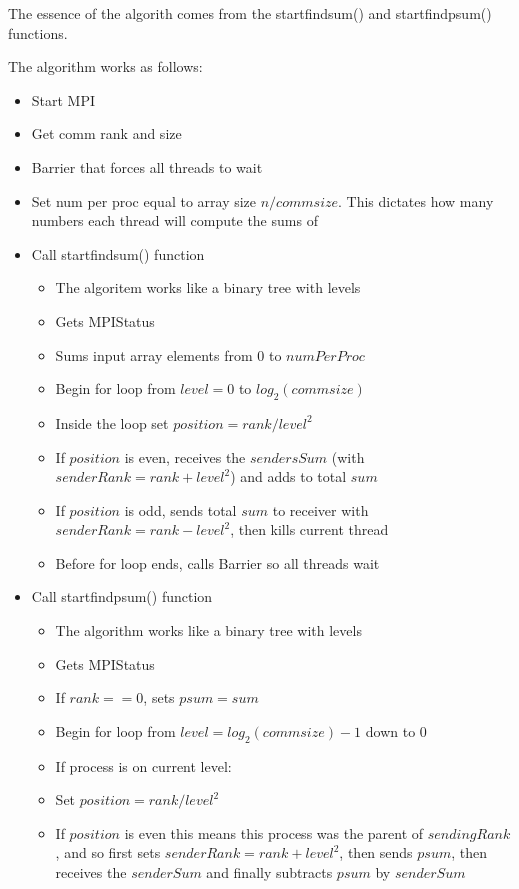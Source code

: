 	The essence of the algorith comes from the start\textunderscore find\textunderscore sum() and start\textunderscore find\textunderscore psum() functions.
	
	The algorithm works as follows:
	\begin{itemize}
		\item Start MPI
		\item Get comm rank and size
		\item Barrier that forces all threads to wait
		\item Set num per proc equal to array size $n / comm size$. This dictates how many numbers each thread will compute the sums of
		\item Call start\textunderscore find\textunderscore sum() function
		\begin{itemize}
			\item The algoritem works like a binary tree with levels
			\item Gets MPI\textunderscore Status
			\item Sums input array elements from $0$ to $numPerProc$
			\item Begin for loop from $level =0$ to $log_{2}(comm size)$
			\item Inside the loop set $position = rank / level^{2}$
			\item If $position$ is even, receives the $sendersSum$ (with $senderRank = rank + level^2$) and adds to total $sum$
			\item If $position$ is odd, sends total $sum$ to receiver with $senderRank = rank - level^2$, then kills current thread
			\item Before for loop ends, calls Barrier so all threads wait
		\end{itemize}
		\item Call start\textunderscore find\textunderscore psum() function
		\begin{itemize}
			\item The algorithm works like a binary tree with levels
			\item Gets MPI\textunderscore Status
			\item If $rank == 0$, sets $psum = sum$
			\item Begin for loop from $level = log_2(comm size) -1$ down to $0$
			\item If process is on current level:
			\item Set $position = rank / level^2$
			\item If $position$ is even this means this process was the parent of $sendingRank$, and so first sets $senderRank = rank + level^2$, then sends $psum$, then receives the $senderSum$ and finally subtracts $psum$ by $senderSum$

\end{itemize}
\end{itemize}
